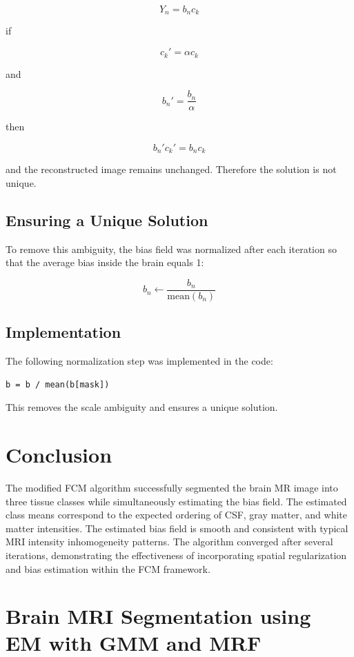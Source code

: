 \documentclass[11pt]{article}
\begin{document}
\[
Y_n = b_n c_k
\]

if

\[
c_k' = \alpha c_k
\]

and

\[
b_n' = \frac{b_n}{\alpha}
\]

then

\[
b_n' c_k' = b_n c_k
\]

and the reconstructed image remains unchanged. Therefore the solution is not unique.

\subsection{Ensuring a Unique Solution}

To remove this ambiguity, the bias field was normalized after each iteration so that the average bias inside the brain equals 1:

\[
b_n \leftarrow \frac{b_n}{\text{mean}(b_n)}
\]

\subsection{Implementation}

The following normalization step was implemented in the code:

\begin{verbatim}
b = b / mean(b[mask])
\end{verbatim}

This removes the scale ambiguity and ensures a unique solution.

\section{Conclusion}

The modified FCM algorithm successfully segmented the brain MR image into three tissue classes while simultaneously estimating the bias field. The estimated class means correspond to the expected ordering of CSF, gray matter, and white matter intensities. The estimated bias field is smooth and consistent with typical MRI intensity inhomogeneity patterns. The algorithm converged after several iterations, demonstrating the effectiveness of incorporating spatial regularization and bias estimation within the FCM framework.

\newpage
\section{Brain MRI Segmentation using EM with GMM and MRF}
\end{document}
